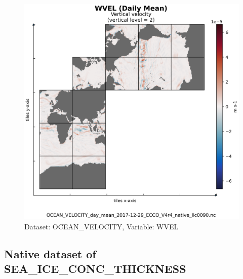 \begin{figure}[H]
\centering
\includegraphics[scale=0.55]{../images/plots/native_plots/Ocean_Velocity/WVEL.png}
\caption{Dataset: OCEAN\_VELOCITY, Variable: WVEL}
\label{tab:table-OCEAN_VELOCITY_WVEL-Plot}
\end{figure}
\newpage
\subsection{Native dataset of SEA\_ICE\_CONC\_THICKNESS}
\newp
